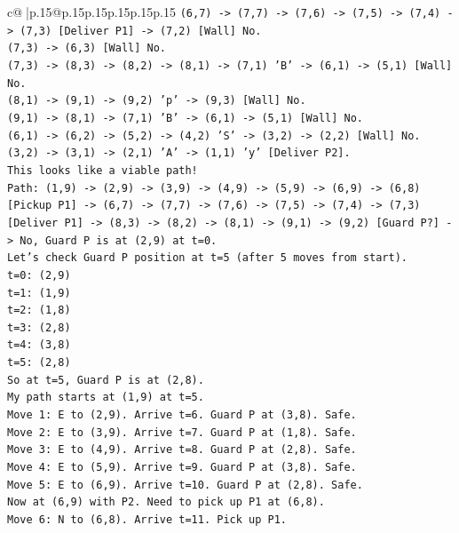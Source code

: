 \documentclass{article}
\begin{document}
{\begin{supertabular}{c@{$\;$}|p{.15\linewidth}@{}p{.15\linewidth}p{.15\linewidth}p{.15\linewidth}p{.15\linewidth}p{.15\linewidth}}
{{{\texttt{(6,7) {-}> (7,7) {-}> (7,6) {-}> (7,5) {-}> (7,4) {-}> (7,3) {[}Deliver P1{]} {-}> (7,2) {[}Wall{]} No.} \\
\texttt{(7,3) {-}> (6,3) {[}Wall{]} No.} \\
\texttt{(7,3) {-}> (8,3) {-}> (8,2) {-}> (8,1) {-}> (7,1) 'B' {-}> (6,1) {-}> (5,1) {[}Wall{]} No.} \\
\texttt{(8,1) {-}> (9,1) {-}> (9,2) 'p' {-}> (9,3) {[}Wall{]} No.} \\
\texttt{(9,1) {-}> (8,1) {-}> (7,1) 'B' {-}> (6,1) {-}> (5,1) {[}Wall{]} No.} \\
\texttt{(6,1) {-}> (6,2) {-}> (5,2) {-}> (4,2) 'S' {-}> (3,2) {-}> (2,2) {[}Wall{]} No.} \\
\texttt{(3,2) {-}> (3,1) {-}> (2,1) 'A' {-}> (1,1) 'y' {[}Deliver P2{]}.} \\
\texttt{This looks like a viable path!} \\
\texttt{Path: (1,9) {-}> (2,9) {-}> (3,9) {-}> (4,9) {-}> (5,9) {-}> (6,9) {-}> (6,8) {[}Pickup P1{]} {-}> (6,7) {-}> (7,7) {-}> (7,6) {-}> (7,5) {-}> (7,4) {-}> (7,3) {[}Deliver P1{]} {-}> (8,3) {-}> (8,2) {-}> (8,1) {-}> (9,1) {-}> (9,2) {[}Guard P?{]} {-}> No, Guard P is at (2,9) at t=0.} \\
\texttt{Let's check Guard P position at t=5 (after 5 moves from start).} \\
\texttt{t=0: (2,9)} \\
\texttt{t=1: (1,9)} \\
\texttt{t=2: (1,8)} \\
\texttt{t=3: (2,8)} \\
\texttt{t=4: (3,8)} \\
\texttt{t=5: (2,8)} \\
\texttt{So at t=5, Guard P is at (2,8).} \\
\texttt{My path starts at (1,9) at t=5.} \\
\texttt{Move 1: E to (2,9). Arrive t=6. Guard P at (3,8). Safe.} \\
\texttt{Move 2: E to (3,9). Arrive t=7. Guard P at (1,8). Safe.} \\
\texttt{Move 3: E to (4,9). Arrive t=8. Guard P at (2,8). Safe.} \\
\texttt{Move 4: E to (5,9). Arrive t=9. Guard P at (3,8). Safe.} \\
\texttt{Move 5: E to (6,9). Arrive t=10. Guard P at (2,8). Safe.} \\
\texttt{Now at (6,9) with P2. Need to pick up P1 at (6,8).} \\
\texttt{Move 6: N to (6,8). Arrive t=11. Pick up P1.} \\
}}}
\end{supertabular}}
\end{document}
